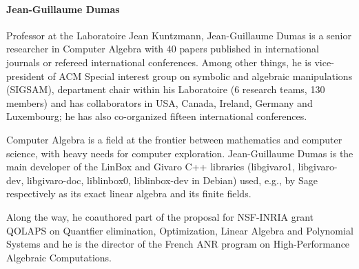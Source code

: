 \paragraph{Jean-Guillaume Dumas}


Professor at the Laboratoire Jean Kuntzmann,
Jean-Guillaume Dumas is a senior researcher in Computer Algebra with 40 papers
published in international journals or refereed international conferences.  
Among other things, he is vice-president of ACM Special interest group on
symbolic and algebraic manipulations (SIGSAM), department chair within his
Laboratoire (6 research teams, 130 members) and has collaborators in USA,
Canada, Ireland, Germany and Luxembourg; he has also co-organized fifteen
international conferences. 

Computer Algebra is a field at the frontier between mathematics
and computer science, with heavy needs for computer exploration. 
Jean-Guillaume Dumas is the main developer of the LinBox and Givaro C++
libraries  (libgivaro1, libgivaro-dev, libgivaro-doc, liblinbox0, liblinbox-dev
in Debian) used, e.g., by Sage respectively as its exact linear algebra and its
finite fields.

Along the way, he coauthored part of the proposal for NSF-INRIA grant QOLAPS on
Quantfier elimination, Optimization, Linear Algebra and Polynomial Systems and
he is the director of the French ANR program on High-Performance Algebraic
Computations. 


